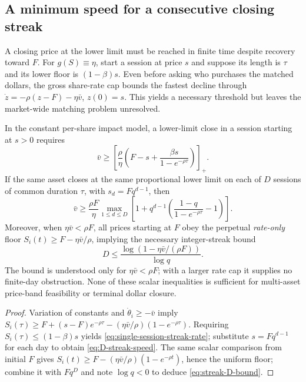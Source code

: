 \documentclass[review,hidelinks,onefignum,onetabnum]{siamonline250211}
\begin{document}
\subsection{A minimum speed for a consecutive closing streak}\label{subsec:multiday-rate}
A closing price at the lower limit must be reached in finite time despite recovery toward $F$. For $g(S)\equiv\eta$, start a session at price $s$ and suppose its length is $\tau$ and its lower floor is $(1-\beta)s$. Even before asking who purchases the matched dollars, the gross share-rate cap bounds the fastest decline through $\dot z=-\rho(z-F)-\eta\bar v$, $z(0)=s$. This yields a necessary threshold but leaves the market-wide matching problem unresolved.
\begin{proposition}\label{prop:rolling-rate}
In the constant per-share impact model, a lower-limit close in a session starting at $s>0$ requires
\begin{equation}\label{eq:single-session-streak-rate}
 \boxed{\quad\bar v\ge \left[\frac{\rho}{\eta}\left(F-s+
 \frac{\beta s}{1-e^{-\rho\tau}}\right)\right]_+.\quad}
\end{equation}
If the same asset closes at the same proportional lower limit on each of $D$ sessions of common duration $\tau$, with $s_d=Fq^{d-1}$, then
\begin{equation}\label{eq:D-streak-speed}
\boxed{\quad\bar v\ge\frac{\rho F}{\eta}\max_{1\le d\le D}
 \left[1+q^{d-1}\left(\frac{1-q}{1-e^{-\rho\tau}}-1\right)\right].\quad}
\end{equation}
Moreover, when $\eta\bar v<\rho F$, all prices starting at $F$ obey the perpetual \emph{rate-only} floor $S_i(t)\ge F-\eta\bar v/\rho$, implying the necessary integer-streak bound
\begin{equation}\label{eq:streak-D-bound}
\boxed{\quad D\le\frac{\log(1-\eta\bar v/(\rho F))}{\log q}.\quad}
\end{equation}
The bound is understood only for $\eta\bar v<\rho F$; with a larger rate cap it supplies no finite-day obstruction. None of these scalar inequalities is sufficient for multi-asset price-band feasibility or terminal dollar closure.
\end{proposition}
\begin{proof}
Variation of constants and $\dot\theta_i\ge-\bar v$ imply
$S_i(\tau)\ge F+(s-F)e^{-\rho\tau}-(\eta\bar v/\rho)(1-e^{-\rho\tau})$.
Requiring $S_i(\tau)\le(1-\beta)s$ yields \eqref{eq:single-session-streak-rate}; substitute $s=Fq^{d-1}$ for each day to obtain \eqref{eq:D-streak-speed}. The same scalar comparison from initial $F$ gives $S_i(t)\ge F-(\eta\bar v/\rho)(1-e^{-\rho t})$, hence the uniform floor; combine it with $Fq^D$ and note $\log q<0$ to deduce \eqref{eq:streak-D-bound}.
\end{proof}
\end{document}
